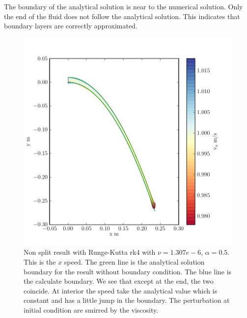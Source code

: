 The boundary of the analytical solution is near to the numerical solution.
Only the end of the fluid does not follow the analytical solution.
This indicates that boundary layers are  correctly approximated.
\begin{figure}
	\includegraphics{topology/lateral_jet/plot_8__1_186.pdf}
	\caption{Non split result with Runge-Kutta rk4 with $\nu=1.307e-6$, $\alpha=0.5$.
	This is the $x$ speed.
	The green line is the analytical solution boundary for the result without boundary condition.
	The blue line is the calculate boundary.
	We see that except at the end, the two coincide.
	At interior the speed take the analytical value which is constant and has a little jump in the boundary.
	The perturbation at initial condition are smirred by the viscosity.}
	\label{topo:extrap:lateral:8_1}
\end{figure}

